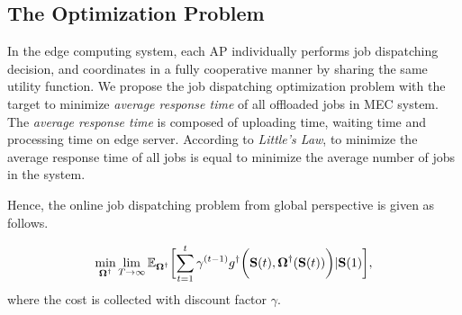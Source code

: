 \subsection{The Optimization Problem}
In the edge computing system, each AP individually performs job dispatching decision, and coordinates in a fully cooperative manner by sharing the same utility function.
We propose the job dispatching optimization problem with the target to minimize \emph{average response time} of all offloaded jobs in MEC system.
The \emph{average response time} is composed of uploading time, waiting time and processing time on edge server.
According to \emph{Little's Law}, to minimize the average response time of all jobs is equal to minimize the average number of jobs in the system.


Hence, the online job dispatching problem from global perspective is given as follows.
\begin{problem}
    \begin{align}
        \min_{\Policy^{\dagger}} \lim_{T \to \infty}
            \mathbb{E}_{\Policy^{\dagger}}
                \Bracket{\sum_{t=1}^t \gamma^{(t-1)} g^{\dagger}\Paren{\Stat(t), \Policy^{\dagger}(\Stat(t))}|\Stat(1)},
    \end{align}
    where the cost is collected with discount factor $\gamma$.
\end{problem}

